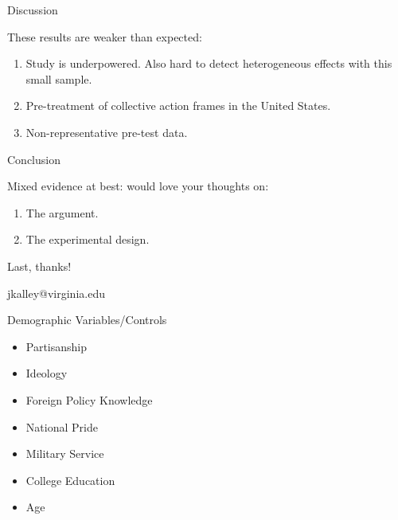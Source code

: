 \documentclass[12pt]{beamer}
\begin{document}


\begin{frame}{Discussion}

These results are weaker than expected:

\pause
\begin{enumerate}
\item Study is underpowered. \pause Also hard to detect heterogeneous effects with this small sample.  
\pause 
\item Pre-treatment of collective action frames in the United States. 
\pause
\item Non-representative pre-test data.
\end{enumerate} 

\end{frame}



\begin{frame}{Conclusion}

Mixed evidence at best: would love your thoughts on:

\pause
\begin{enumerate}
\item The argument. 
\pause
\item The experimental design. 
\end{enumerate}


\end{frame}




\begin{frame}[standout]

Last, thanks! 

jkalley@virginia.edu

\end{frame}


\appendix 


\begin{frame}{Demographic Variables/Controls}

\begin{itemize}
\item Partisanship
\item Ideology
\item Foreign Policy Knowledge
\item National Pride 
\item Military Service
\item College Education
\item Age
\end{itemize} 

\end{frame}
\end{document}
